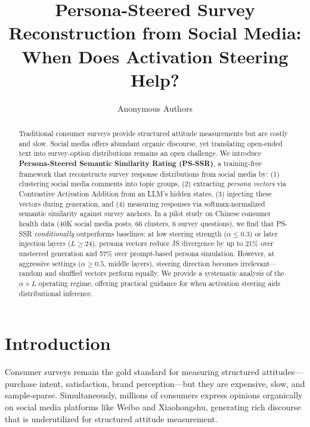 \documentclass[letterpaper]{article}
\title{\textbf{Persona-Steered Survey Reconstruction from Social Media:\\When Does Activation Steering Help?}}
\author{
    Anonymous Authors
}
\date{}
\newcommand{\method}{PS-SSR}
\begin{document}
\maketitle

\begin{abstract}

Traditional consumer surveys provide structured attitude measurements but are costly and slow. Social media offers abundant organic discourse, yet translating open-ended text into survey-option distributions remains an open challenge. We introduce \textbf{Persona-Steered Semantic Similarity Rating (\method{})}, a training-free framework that reconstructs survey response distributions from social media by: (1) clustering social media comments into topic groups, (2) extracting \emph{persona vectors} via Contrastive Activation Addition from an LLM's hidden states, (3) injecting these vectors during generation, and (4) measuring responses via softmax-normalized semantic similarity against survey anchors. In a pilot study on Chinese consumer health data (40K social media posts, 66 clusters, 6 survey questions), we find that \method{} \emph{conditionally} outperforms baselines: at low steering strength ($\alpha \leq 0.3$) or later injection layers ($L \geq 24$), persona vectors reduce JS divergence by up to 21\% over unsteered generation and 57\% over prompt-based persona simulation. However, at aggressive settings ($\alpha \geq 0.5$, middle layers), steering direction becomes irrelevant---random and shuffled vectors perform equally. We provide a systematic analysis of the $\alpha \times L$ operating regime, offering practical guidance for when activation steering aids distributional inference.

\end{abstract}

\section{Introduction}
\label{sec:intro}

Consumer surveys remain the gold standard for measuring structured attitudes---purchase intent, satisfaction, brand perception---but they are expensive, slow, and sample-sparse. Simultaneously, millions of consumers express opinions organically on social media platforms like Weibo and Xiaohongshu, generating rich discourse that is underutilized for structured attitude measurement.
\end{document}
